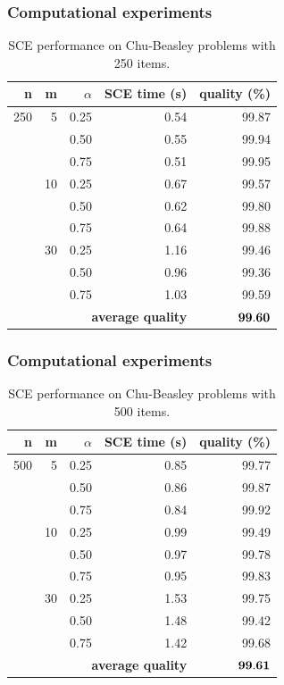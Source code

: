 \documentclass[10pt,fleqn]{beamer}
\begin{document}
\begin{frame}
	\frametitle{Computational experiments}
\begin{table}
{
\renewcommand{\arraystretch}{1.5}%
\fontsize{8.5pt}{1em}\selectfont 
\begin{center}
\begin{tabular}{|r|r|r|rr|} \hline
\textbf{n}   & \textbf{m}  & \textbf{$\alpha$} & \textbf{SCE time (s)} & \textbf{quality (\%)} \\ \hline
250 &  5 & 0.25 & 0.54 & 99.87 \\
    &    & 0.50 & 0.55 & 99.94 \\
    &    & 0.75 & 0.51 & 99.95 \\ \cline{2-5}
    & 10 & 0.25 & 0.67 & 99.57 \\
    &    & 0.50 & 0.62 & 99.80 \\
    &    & 0.75 & 0.64 & 99.88 \\ \cline{2-5}
    & 30 & 0.25 & 1.16 & 99.46 \\
    &    & 0.50 & 0.96 & 99.36 \\
    &    & 0.75 & 1.03 & 99.59 \\ \hline
    & \multicolumn{3}{r}{\textbf{average quality}}  & $\bf 99.60$  \\ \hline
\end{tabular}
\end{center}
}
 \caption{SCE performance on Chu-Beasley problems with 250 items.}
\end{table}
\end{frame}

\begin{frame}
	\frametitle{Computational experiments}
\begin{table}
{
\renewcommand{\arraystretch}{1.5}%
\fontsize{8.5pt}{1em}\selectfont 
\begin{center}
\begin{tabular}{|r|r|r|rr|} \hline
\textbf{n}   & \textbf{m}  & \textbf{$\alpha$} & \textbf{SCE time (s)} & \textbf{quality (\%)} \\ \hline
500 &  5 & 0.25 & 0.85 & 99.77 \\
    &    & 0.50 & 0.86 & 99.87 \\
    &    & 0.75 & 0.84 & 99.92 \\ \cline{2-5}
    & 10 & 0.25 & 0.99 & 99.49 \\
    &    & 0.50 & 0.97 & 99.78 \\
    &    & 0.75 & 0.95 & 99.83 \\ \cline{2-5}
    & 30 & 0.25 & 1.53 & 99.75 \\
    &    & 0.50 & 1.48 & 99.42 \\
    &    & 0.75 & 1.42 & 99.68 \\ \hline
    & \multicolumn{3}{r}{\textbf{average quality}}  & $\bf 99.61$  \\ \hline
\end{tabular}
\end{center}
}
 \caption{SCE performance on Chu-Beasley problems with 500 items.}
\end{table}
\end{frame}
\end{document}
